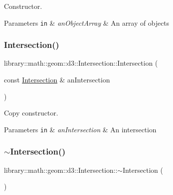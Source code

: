 Constructor. 


\begin{DoxyParams}[1]{Parameters}
\mbox{\tt in}  & {\em an\+Object\+Array} & An array of objects \\
\hline
\end{DoxyParams}
\mbox{\label{classlibrary_1_1math_1_1geom_1_1d3_1_1_intersection_a6eacd360660163afafb78178d25ad714}} 
\subsubsection{\texorpdfstring{Intersection()}{Intersection()}\hspace{0.1cm}{\footnotesize\ttfamily [2/2]}}
{\footnotesize\ttfamily library\+::math\+::geom\+::d3\+::\+Intersection\+::\+Intersection (\begin{DoxyParamCaption}\item[{const \hyperlink{classlibrary_1_1math_1_1geom_1_1d3_1_1_intersection}{Intersection} \&}]{an\+Intersection }\end{DoxyParamCaption})}



Copy constructor. 


\begin{DoxyParams}[1]{Parameters}
\mbox{\tt in}  & {\em an\+Intersection} & An intersection \\
\hline
\end{DoxyParams}
\mbox{\label{classlibrary_1_1math_1_1geom_1_1d3_1_1_intersection_af2c13f6bc69d8271600d0f30848dd64b}} 
\subsubsection{\texorpdfstring{$\sim$\+Intersection()}{~Intersection()}}
{\footnotesize\ttfamily library\+::math\+::geom\+::d3\+::\+Intersection\+::$\sim$\+Intersection (\begin{DoxyParamCaption}{ }\end{DoxyParamCaption})}



